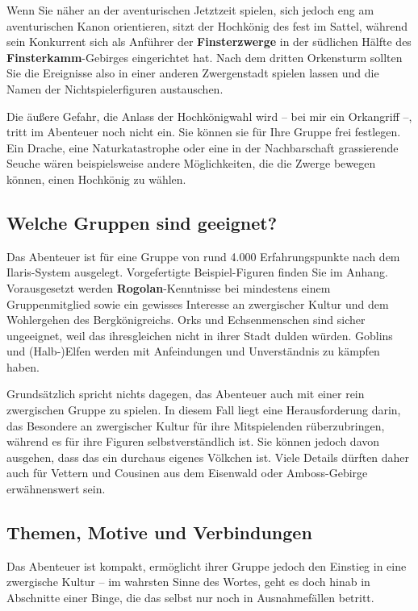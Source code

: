 Wenn Sie näher an der aventurischen Jetztzeit spielen, sich jedoch eng am aventurischen Kanon orientieren, sitzt der Hochkönig des \fkvs fest im Sattel,
während sein Konkurrent sich als Anführer der \textbf{Finsterzwerge} in der südlichen Hälfte des \textbf{Finsterkamm}-Gebirges eingerichtet hat.
Nach dem dritten Orkensturm sollten Sie die Ereignisse also in einer anderen Zwergenstadt spielen lassen und die Namen der Nichtspielerfiguren austauschen.

Die äußere Gefahr, die Anlass der Hochkönigwahl wird -- bei mir ein Orkangriff --, tritt im Abenteuer noch nicht ein. Sie können sie für Ihre Gruppe frei festlegen.
Ein Drache, eine Naturkatastrophe oder eine in der Nachbarschaft grassierende Seuche wären beispielsweise andere Möglichkeiten, die die Zwerge bewegen können, einen Hochkönig zu wählen.

\subsection{Welche Gruppen sind geeignet?}
Das Abenteuer ist für eine Gruppe von rund 4.000 Erfahrungspunkte nach dem Ilaris-System ausgelegt. Vorgefertigte Beispiel-Figuren finden Sie im Anhang.
Vorausgesetzt werden \textbf{Rogolan}-Kenntnisse bei mindestens einem Gruppenmitglied sowie ein gewisses Interesse an zwergischer Kultur und dem Wohlergehen des Bergkönigreichs.
Orks und Echsenmenschen sind sicher ungeeignet, weil das \fkv ihresgleichen nicht in ihrer Stadt dulden würden.
Goblins und (Halb-)Elfen werden mit Anfeindungen und Unverständnis zu kämpfen haben.

Grundsätzlich spricht nichts dagegen, das Abenteuer auch mit einer rein zwergischen Gruppe zu spielen.
In diesem Fall liegt eine Herausforderung darin,  das Besondere an zwergischer Kultur für ihre Mitspielenden rüberzubringen,
während es für ihre Figuren selbstverständlich ist.
Sie können jedoch davon ausgehen, dass das \fkv ein durchaus eigenes Völkchen ist.
Viele Details dürften daher auch für  Vettern und Cousinen aus dem Eisenwald oder Amboss-Gebirge erwähnenswert sein.

\subsection{Themen, Motive und Verbindungen}
Das Abenteuer ist kompakt, ermöglicht  ihrer Gruppe jedoch den Einstieg in eine zwergische Kultur
-- im wahrsten Sinne des Wortes, geht es doch hinab in Abschnitte einer Binge,
die das \fkv selbst nur noch in  Ausnahmefällen betritt.

